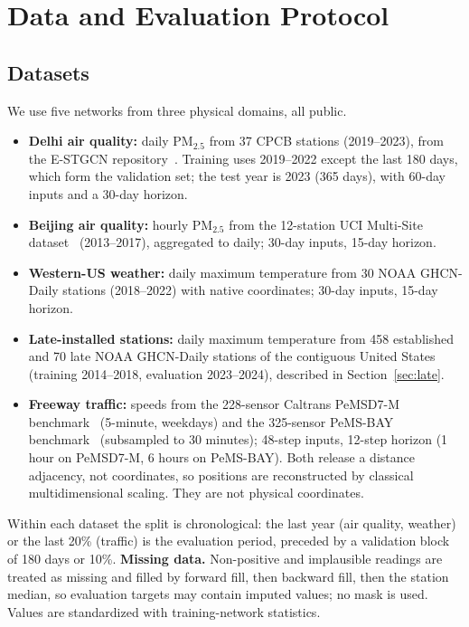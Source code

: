 \section{Data and Evaluation Protocol}
\label{sec:experiments}

\subsection{Datasets}
We use five networks from three physical domains, all public.
\begin{itemize}
\item \textbf{Delhi air quality:} daily PM$_{2.5}$ from 37 CPCB stations (2019--2023), from the
E-STGCN repository~\cite{panja2026estgcn}. Training uses 2019--2022 except the last 180 days, which
form the validation set; the test year is 2023 (365 days), with 60-day inputs and a 30-day horizon.
\item \textbf{Beijing air quality:} hourly PM$_{2.5}$ from the 12-station UCI Multi-Site
dataset~\cite{zhang2017beijingair} (2013--2017), aggregated to daily; 30-day inputs, 15-day horizon.
\item \textbf{Western-US weather:} daily maximum temperature from 30 NOAA GHCN-Daily stations
(2018--2022) with native coordinates; 30-day inputs, 15-day horizon.
\item \textbf{Late-installed stations:} daily maximum temperature from 458 established and 70 late NOAA GHCN-Daily
stations of the contiguous United States (training 2014--2018, evaluation 2023--2024), described in
Section~\ref{sec:late}.
\item \textbf{Freeway traffic:} speeds from the 228-sensor Caltrans PeMSD7-M
benchmark~\cite{yu2018stgcn} (5-minute, weekdays) and the 325-sensor PeMS-BAY benchmark~\cite{li2018dcrnn}
(subsampled to 30 minutes); 48-step inputs, 12-step horizon (1 hour on PeMSD7-M, 6 hours on PeMS-BAY). Both release a distance adjacency, not coordinates, so positions are reconstructed by
classical multidimensional scaling. They are not physical coordinates.
\end{itemize}
Within each dataset the split is chronological: the last year (air quality, weather) or the last 20\%
(traffic) is the evaluation period, preceded by a validation block of 180 days or 10\%.
\textbf{Missing data.} Non-positive and implausible readings are treated as missing and filled by forward fill,
then backward fill, then the station median, so evaluation targets may contain imputed values; no mask is used.
Values are standardized with training-network statistics.
